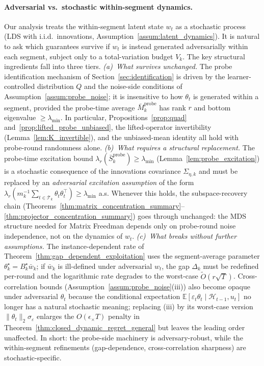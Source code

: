 \documentclass[11pt]{article}
\newcommand{\E}{\mathbb{E}}
\newcommand{\cH}{\mathcal{H}}
\newcommand{\cT}{\mathcal{T}}
\begin{document}
\paragraph{Adversarial vs.\ stochastic within-segment dynamics.}
\label{par:adversarial_framing}
Our analysis treats the within-segment latent state $w_t$ as a stochastic
process (LDS with i.i.d.\ innovations, Assumption~\ref{assum:latent_dynamics}).
It is natural to ask which guarantees survive if $w_t$ is instead generated
adversarially within each segment, subject only to a total-variation
budget $V_k$.  The key structural ingredients fall into three tiers.
\emph{(a)~What survives unchanged.}
The probe identification mechanism of Section~\ref{sec:identification} is
driven by the learner-controlled distribution $Q$ and the noise-side
conditions of Assumption~\ref{assum:probe_noise}; it is insensitive to how
$\theta_t$ is generated within a segment, provided the probe-time average
$\bar M_k^{\mathrm{probe}}$ has rank $r$ and bottom eigenvalue
$\ge\lambda_{\min}$.  In particular, Propositions~\ref{prop:quad}
and~\ref{prop:lifted_probe_unbiased}, the lifted-operator invertibility
(Lemma~\ref{lem:K_invertible}), and the unbiased-mean identity all hold with
probe-round randomness alone.
\emph{(b)~What requires a structural replacement.}
The probe-time excitation bound
$\lambda_r(\bar S_k^{\mathrm{probe}})\ge\lambda_{\min}$
(Lemma~\ref{lem:probe_excitation}) is a stochastic consequence of the
innovations covariance $\Sigma_{\eta,k}$ and must be replaced by an
\emph{adversarial excitation assumption} of the form
$\lambda_r(m_k^{-1}\sum_{t\in\cT_k}\theta_t\theta_t^\top)\ge\lambda_{\min}$
a.s.  Whenever this holds, the subspace-recovery chain
(Theorems~\ref{thm:matrix_concentration_summary}--\ref{thm:projector_concentration_summary})
goes through unchanged: the MDS structure needed for Matrix Freedman
depends only on probe-round noise independence, not on the dynamics of
$w_t$.
\emph{(c)~What breaks without further assumptions.}
The instance-dependent rate of
Theorem~\ref{thm:gap_dependent_exploitation} uses the segment-average
parameter $\theta_k^\star=B_k^\star\bar w_k$; if $\bar w_k$ is ill-defined
under adversarial $w_t$, the gap $\Delta_k$ must be redefined per-round
and the logarithmic rate degrades to the worst-case $\widetilde O(r\sqrt T)$.
Cross-correlation bounds (Assumption~\ref{assum:probe_noise}(iii)) also
become opaque under adversarial $\theta_t$ because the conditional
expectation $\E[\varepsilon_t\theta_t\mid\cH_{t-1},u_t]$ no longer has a
natural stochastic meaning; replacing (iii) by its worst-case version
$\|\theta_t\|_2\sigma_\varepsilon$ enlarges the $O(\epsilon_\times T)$
penalty in Theorem~\ref{thm:closed_dynamic_regret_general} but leaves the
leading order unaffected.
In short: the probe-side machinery is adversary-robust, while the
within-segment refinements (gap-dependence, cross-correlation sharpness)
are stochastic-specific.
\end{document}
